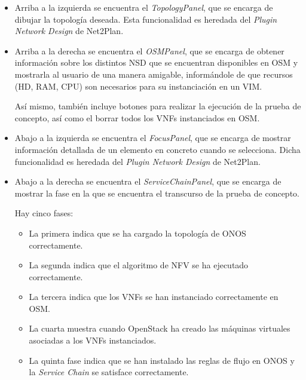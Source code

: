 \begin{itemize}
	\item Arriba a la izquierda se encuentra el \textit{TopologyPanel}, que se encarga de dibujar la topología deseada. Esta funcionalidad es heredada del \textit{Plugin Network Design} de Net2Plan.
	
	\item Arriba a la derecha se encuentra el \textit{OSMPanel}, que se encarga de obtener información sobre los distintos NSD que se encuentran disponibles en OSM y mostrarla al usuario de una manera amigable, informándole de que recursos (\ac{HD}, \ac{RAM}, \ac{CPU}) son necesarios para su instanciación en un VIM.
	
	Así mismo, también incluye botones para realizar la ejecución de la prueba de concepto, así como el borrar todos los \acp{VNF} instanciados en \ac{OSM}.
	
	\item Abajo a la izquierda se encuentra el \textit{FocusPanel}, que se encarga de mostrar información detallada de un elemento en concreto cuando se selecciona. Dicha funcionalidad es heredada del \textit{Plugin Network Design} de Net2Plan.
	
	\item Abajo a la derecha se encuentra el \textit{ServiceChainPanel}, que se encarga de mostrar la fase en la que se encuentra el transcurso de la prueba de concepto. 
	
	Hay cinco fases: 
	
	\begin{itemize}
		
		\item La primera indica que se ha cargado la topología de \ac{ONOS} correctamente.
		
		\item La segunda indica que el algoritmo de \ac{NFV} se ha ejecutado correctamente.
		
		\item La tercera indica que los \acp{VNF} se han instanciado correctamente en \ac{OSM}.
		
		\item La cuarta muestra cuando OpenStack ha creado las máquinas virtuales asociadas a los \acp{VNF} instanciados.
		
		\item La quinta fase indica que se han instalado las reglas de flujo en \ac{ONOS} y la \textit{Service Chain} se satisface correctamente.
		
	\end{itemize}

\end{itemize}


\cleardoublepage